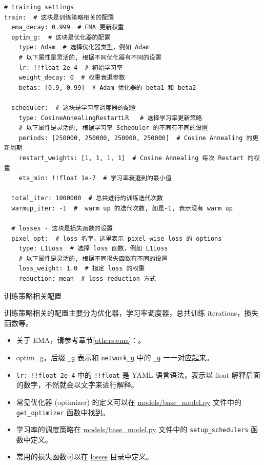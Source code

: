 \documentclass[../main.tex]{subfiles}
\begin{document}
\begin{verbatim}
# training settings
train:  # 这块是训练策略相关的配置
  ema_decay: 0.999  # EMA 更新权重
  optim_g:  # 这块是优化器的配置
    type: Adam  # 选择优化器类型，例如 Adam
    # 以下属性是灵活的, 根据不同优化器有不同的设置
    lr: !!float 2e-4  # 初始学习率
    weight_decay: 0  # 权重衰退参数
    betas: [0.9, 0.99]  # Adam 优化器的 beta1 和 beta2

  scheduler:  # 这块是学习率调度器的配置
    type: CosineAnnealingRestartLR   # 选择学习率更新策略
    # 以下属性是灵活的, 根据学习率 Scheduler 的不同有不同的设置
    periods: [250000, 250000, 250000, 250000]  # Cosine Annealing 的更新周期
    restart_weights: [1, 1, 1, 1]  # Cosine Annealing 每次 Restart 的权重
    eta_min: !!float 1e-7  # 学习率衰退到的最小值

  total_iter: 1000000  # 总共进行的训练迭代次数
  warmup_iter: -1  #  warm up 的迭代次数, 如是-1, 表示没有 warm up

  # losses - 这块是损失函数的设置
  pixel_opt:  # loss 名字，这里表示 pixel-wise loss 的 options
    type: L1Loss  # 选择 loss 函数，例如 L1Loss
    # 以下属性是灵活的, 根据不同损失函数有不同的设置
    loss_weight: 1.0  # 指定 loss 的权重
    reduction: mean  # loss reduction 方式
\end{verbatim}

\begin{exampleBox}[righthand ratio=0.00, sidebyside, sidebyside align=center, lower separated=false]{训练策略相关配置}

训练策略相关的配置主要分为优化器，学习率调度器，总共训练 iterations，损失函数等。
\begin{itemize}
    \item 关于 EMA，请参考章节\ref{others:ema}：。
    \item optim\_g，后缀 \texttt{\_g} 表示和 \texttt{network\_g} 中的 \texttt{\_g} 一一对应起来。
    \item \texttt{lr: !!float 2e-4} 中的 \texttt{!!float} 是 YAML 语言语法，表示以 float 解释后面的数字，不然就会以文字来进行解释。
    \item 常见优化器 (optimizer) 的定义可以在 \href{https://github.com/XPixelGroup/BasicSR/blob/master/basicsr/models/base_model.py}{models/base\_model.py} 文件中的 \texttt{get\_optimizer} 函数中找到。
    \item 学习率的调度策略在 \href{https://github.com/XPixelGroup/BasicSR/blob/master/basicsr/models/base_model.py}{models/base\_model.py}  文件中的 \texttt{setup\_schedulers} 函数中定义。
    \item 常用的损失函数可以在 \href{https://github.com/XPixelGroup/BasicSR/tree/master/basicsr/losses}{losses} 目录中定义。
\end{itemize}
\end{exampleBox}
\end{document}
